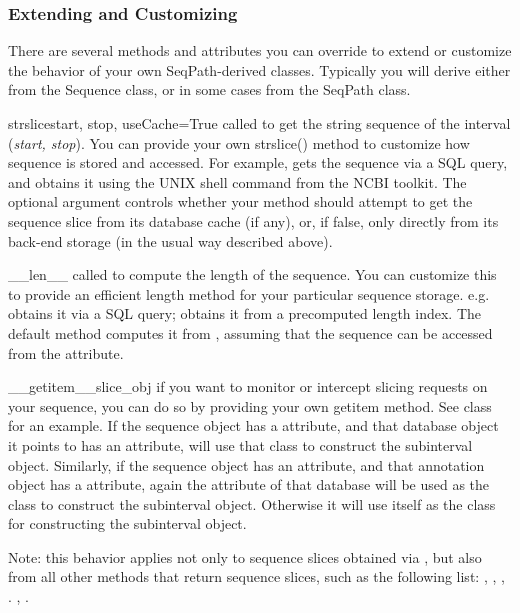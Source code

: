 \documentclass{howto}
\begin{document}
\subsubsection{Extending and Customizing}
There are several methods and attributes you can override to extend or customize
the behavior of your own SeqPath-derived classes.  Typically you will derive
either from the Sequence class, or in some cases from the SeqPath class.

\begin{funcdesc}{strslice}{start, stop, useCache=True} 
  called to get the string
  sequence of the interval ({\em start, stop}).  You can provide your own strslice()
  method to customize how sequence is stored and accessed.  For example,
   gets the sequence via a SQL query, and 
   obtains it using the 
  UNIX shell command from the NCBI toolkit.
  The optional  argument controls whether your  method
  should attempt to get the sequence slice from its database cache (if any),
  or, if false, only directly from its back-end storage (in the usual way
  described above).
\end{funcdesc}

\begin{funcdesc}{__len__}{}
  called to compute the length of the sequence.  You can
  customize this to provide an efficient length method for your particular
  sequence storage.  e.g.  obtains it via a SQL query; 
   obtains it from a precomputed length index.
  The default  method computes it from 
  , assuming that the sequence can be accessed
  from the  attribute.
\end{funcdesc}

\begin{funcdesc}{__getitem__}{slice_obj}
  if you want to monitor or intercept slicing
  requests on your sequence, you can do so by providing your own getitem method.
  See  class for an example.
  If the sequence object has a  attribute, and that database object
  it points to has an  attribute, 
  will use that class to construct the subinterval object.  Similarly,
  if the sequence object has an  attribute, and that annotation
  object has a  attribute, again the  attribute
  of that database will be used as the class to construct the subinterval
  object.  Otherwise it will
  use  itself as the class for constructing the subinterval object.

  Note: this  behavior applies not only to 
  sequence slices obtained via , but also from all other
  methods that return sequence slices, such as the following list:
  , , , .
  , .
\end{funcdesc}
\end{document}
